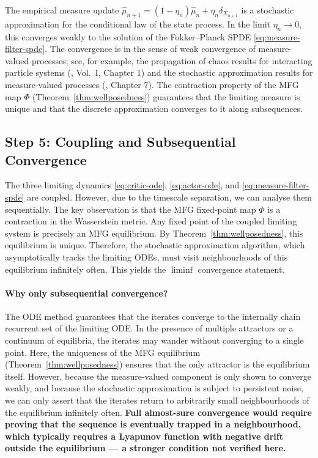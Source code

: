 The empirical measure update $\hat\mu_{n+1} = (1-\eta_n)\hat\mu_n + \eta_n
\delta_{X_{n+1}}$ is a stochastic approximation for the conditional law of the state
process. In the limit $\eta_n \to 0$, this converges weakly to the solution of the
Fokker--Planck SPDE \eqref{eq:measure-filter-spde}. The convergence is in the sense of
weak convergence of measure-valued processes; see, for example, the propagation of
chaos results for interacting particle systems (\citep{carmonadelarue2018}, Vol.\ I,
Chapter 1) and the stochastic approximation results for measure-valued processes
(\citep{borkar2008}, Chapter 7). The contraction property of the MFG map $\Phi$
(Theorem~\ref{thm:wellposedness}) guarantees that the limiting measure is unique and
that the discrete approximation converges to it along subsequences.

\subsection{Step 5: Coupling and Subsequential Convergence}

The three limiting dynamics \eqref{eq:critic-ode}, \eqref{eq:actor-ode}, and
\eqref{eq:measure-filter-spde} are coupled. However, due to the timescale separation,
we can analyse them sequentially. The key observation is that the MFG fixed-point map
$\Phi$ is a contraction in the Wasserstein metric. Any fixed point of the coupled
limiting system is precisely an MFG equilibrium. By Theorem~\ref{thm:wellposedness},
this equilibrium is unique. Therefore, the stochastic approximation algorithm, which
asymptotically tracks the limiting ODEs, must visit neighbourhoods of this
equilibrium infinitely often. This yields the $\liminf$ convergence statement.

\paragraph{Why only subsequential convergence?} The ODE method guarantees that the
iterates converge to the internally chain recurrent set of the limiting ODE. In the
presence of multiple attractors or a continuum of equilibria, the iterates may wander
without converging to a single point. Here, the uniqueness of the MFG equilibrium
(Theorem~\ref{thm:wellposedness}) ensures that the only attractor is the equilibrium
itself. However, because the measure-valued component is only shown to converge
weakly, and because the stochastic approximation is subject to persistent noise, we
can only assert that the iterates return to arbitrarily small neighbourhoods of the
equilibrium infinitely often. \textbf{Full almost-sure convergence would require
proving that the sequence is eventually trapped in a neighbourhood, which typically
requires a Lyapunov function with negative drift outside the equilibrium --- a
stronger condition not verified here.}

